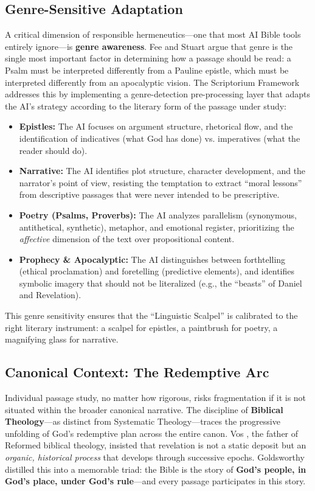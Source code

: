 \subsection{Genre-Sensitive Adaptation}
A critical dimension of responsible hermeneutics---one that most AI Bible tools entirely ignore---is \textbf{genre awareness}. Fee and Stuart \cite{fee2003} argue that genre is the single most important factor in determining how a passage should be read: a Psalm must be interpreted differently from a Pauline epistle, which must be interpreted differently from an apocalyptic vision. The Scriptorium Framework addresses this by implementing a genre-detection pre-processing layer that adapts the AI's strategy according to the literary form of the passage under study:

\begin{itemize}
    \item \textbf{Epistles:} The AI focuses on argument structure, rhetorical flow, and the identification of indicatives (what God has done) vs. imperatives (what the reader should do).
    \item \textbf{Narrative:} The AI identifies plot structure, character development, and the narrator's point of view, resisting the temptation to extract ``moral lessons'' from descriptive passages that were never intended to be prescriptive.
    \item \textbf{Poetry (Psalms, Proverbs):} The AI analyzes parallelism (synonymous, antithetical, synthetic), metaphor, and emotional register, prioritizing the \textit{affective} dimension of the text over propositional content.
    \item \textbf{Prophecy \& Apocalyptic:} The AI distinguishes between forthtelling (ethical proclamation) and foretelling (predictive elements), and identifies symbolic imagery that should not be literalized (e.g., the ``beasts'' of Daniel and Revelation).
\end{itemize}

This genre sensitivity ensures that the ``Linguistic Scalpel'' is calibrated to the right literary instrument: a scalpel for epistles, a paintbrush for poetry, a magnifying glass for narrative.

\subsection{Canonical Context: The Redemptive Arc}
Individual passage study, no matter how rigorous, risks fragmentation if it is not situated within the broader canonical narrative. The discipline of \textbf{Biblical Theology}---as distinct from Systematic Theology---traces the progressive unfolding of God's redemptive plan across the entire canon. Vos \cite{vos1948}, the father of Reformed biblical theology, insisted that revelation is not a static deposit but an \textit{organic, historical process} that develops through successive epochs. Goldsworthy \cite{goldsworthy1991} distilled this into a memorable triad: the Bible is the story of \textbf{God's people, in God's place, under God's rule}---and every passage participates in this story.

